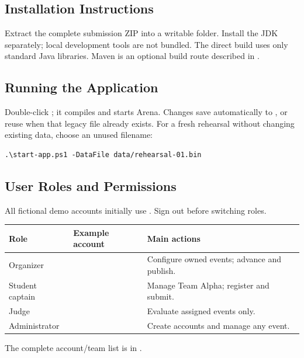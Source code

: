\documentclass[12pt]{article}
\begin{document}
\subsection{Installation Instructions}
Extract the complete submission ZIP into a writable folder. Install the JDK separately; local development tools are not bundled. The direct build uses only standard Java libraries. Maven is an optional build route described in .

\subsection{Running the Application}
Double-click ; it compiles and starts Arena. Changes save automatically to , or reuse  when that legacy file already exists. For a fresh rehearsal without changing existing data, choose an unused filename:
\begin{verbatim}
.\start-app.ps1 -DataFile data/rehearsal-01.bin
\end{verbatim}

\subsection{User Roles and Permissions}
All fictional demo accounts initially use . Sign out before switching roles.
\begin{tabularx}{\linewidth}{lY Y}\toprule Role & Example account & Main actions\\\midrule
Organizer &  & Configure owned events; advance and publish.\\
Student captain &  & Manage Team Alpha; register and submit.\\
Judge &  & Evaluate assigned events only.\\
Administrator &  & Create accounts and manage any event.\\\bottomrule\end{tabularx}
The complete account/team list is in .
\end{document}
